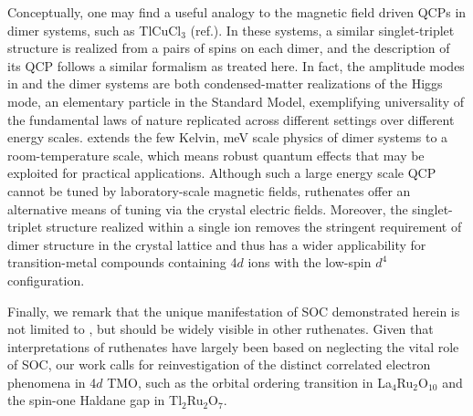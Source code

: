 Conceptually, one may find a useful analogy to the magnetic field driven QCPs in dimer systems, such as TlCuCl$_3$ (ref.\cite{R_egg_2003}). In these systems, a similar singlet-triplet structure is realized from a pairs of spins on each dimer, and the description of its QCP follows a similar formalism as treated here. In fact, the amplitude modes in \CRO and the dimer systems are both condensed-matter realizations of the Higgs mode, an elementary particle in the Standard Model, exemplifying universality of the fundamental laws of nature replicated across different settings over different energy scales. \CRO extends the few Kelvin, meV scale physics of dimer systems to a room-temperature scale, which means robust quantum effects that may be exploited for practical applications. Although such a large energy scale QCP cannot be tuned by laboratory-scale magnetic fields, ruthenates offer an alternative means of tuning via the crystal electric fields. Moreover, the singlet-triplet structure realized within a single ion removes the stringent requirement of dimer structure in the crystal lattice and thus has a wider applicability for transition-metal compounds containing 4$d$ ions with the low-spin $d^4$ configuration.
  
Finally, we remark that the unique manifestation of SOC demonstrated herein is not limited to \CROns, but should be widely visible in other ruthenates. Given that interpretations of ruthenates have largely been based on neglecting the vital role of SOC, our work calls for reinvestigation of the distinct correlated electron phenomena in 4$d$ TMO, such as the orbital ordering transition in La$_4$Ru$_2$O$_{10}$ and the spin-one Haldane gap in Tl$_2$Ru$_2$O$_7$.
  
  
  
  
  
  
  